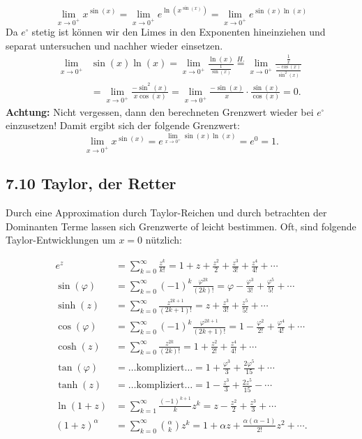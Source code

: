 \documentclass[a4paper,landscape,8pt]{extarticle}
\newcommand{\Achtung}{\textbf{Achtung: }}
\begin{document}
\begin{multicols*}{4}
\begin{warmup}
\Bsp
\[
\lim_{x\to 0^+} x^{\sin(x)}
= \lim_{x\to 0^+} e^{\ln(x^{\sin(x)})}
= \lim_{x\to 0^+} e^{\sin(x)\ln(x)}
\]
Da $e^{\square}$ stetig ist können wir den Limes in den Exponenten hineinziehen
und separat untersuchen und nachher wieder einsetzen.
\begin{align*}
\lim_{x\to 0^+} &\sin(x)\ln(x) = \lim_{x\to 0^+}
\frac{\ln(x)}{\frac{1}{\sin(x)}}
\stackrel{H.}{=}
\lim_{x\to 0^+} \frac{\frac{1}{x}}{\frac{-\cos(x)}{\sin^2(x)}}\\
&= \lim_{x\to 0^+} \frac{-\sin^2(x)}{x\cos(x)}
= \lim_{x\to 0^+} \frac{-\sin(x)}{x}\cdot\frac{\sin(x)}{\cos(x)}=0.
\end{align*}
\Achtung Nicht vergessen, dann den berechneten Grenzwert wieder bei $e^\square$
einzusetzen! Damit ergibt sich der folgende Grenzwert:
\[
\lim_{x\to 0^+} x^{\sin(x)}
= e^{\lim_{x\to 0^+} \sin(x)\ln(x)}
=e^0 = 1.
\]
\end{warmup}
 
\subsection{7.10 Taylor, der Retter}

Durch eine Approximation durch Taylor-Reichen und durch betrachten der
Dominanten Terme lassen sich Grenzwerte of leicht bestimmen. Oft, sind folgende
Taylor-Entwicklungen um $x=0$ nützlich:

\begin{align*}
e^z	      
&= \sum_{k=0}^{\infty} \frac{z^k}{k!} 
= 1 + z + \frac{z^2}{2}+\frac{z^3}{3!}+\frac{z^4}{4!}+\cdots
\\
\sin(\varphi)  
& =\sum_{k=0}^{\infty} (-1)^k \frac{\varphi^{2k}}{(2k)!}
= \varphi - \frac{\varphi^3}{3!} + \frac{\varphi^5}{5!}+\cdots
\\
\sinh(z)
& = \sum_{k=0}^{\infty} \frac{z^{2k+1}}{(2k+1)!}
= z + \frac{z^3}{3!} + \frac{z^5}{5!}+\cdots
\\
\cos(\varphi)  
& = \sum_{k=0}^{\infty} (-1)^k \frac{\varphi^{2k+1}}{(2k+1)!}
= 1 - \frac{\varphi^2}{2!} + \frac{\varphi^4}{4!}+\cdots
\\
\cosh(z)
& =
\sum_{k=0}^\infty \frac{z^{2k}}{(2k)!}
= 1 + \frac{z^2}{2!} + \frac{z^4}{4!}+\cdots
\\
\tan(\varphi)  
& = \ldots \text{kompliziert} \ldots
= 1 + \frac{\varphi^3}{3} + \frac{2\varphi^5}{15}+\cdots
\\
\tanh(z)
& = \ldots \text{kompliziert} \ldots
= 1 - \frac{z^3}{3} + \frac{2z^5}{15}-\cdots
\\
\ln(1+z)
& = \sum_{k=1}^{\infty} \frac{(-1)^{k+1}}{k} z^k
= z - \frac{z^2}{2} + \frac{z^3}{3} + \cdots
\\
(1+z)^\alpha
& = \sum_{k=0}^\infty \binom{\alpha}{k} z^k
= 1 + \alpha z + \frac{\alpha(\alpha -1)}{2!}z^2 + \cdots .
\end{align*}


\end{multicols*}
\end{document}
